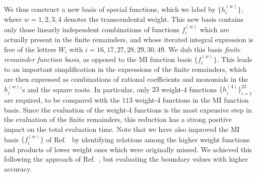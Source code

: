 \documentclass[main.tex]{subfiles}
\begin{document}
We thus construct a new basis of special functions, which we label by $\{h^{(w)}_i\}$, where $w=1,2,3,4$ denotes the transcendental weight. This new basis contains only those linearly independent combinations of functions $f^{(w)}_i$ which are actually present in the finite remainders, and whose iterated integral expression is free of the letters $W_i$ with $i=16,17,27,28,29,30,49$. We dub this basis \textit{finite remainder function basis}, as opposed to the MI function basis $\{f^{(w)}_i\}$. This leads to an important simplification in the expressions of the finite remainders, which are then expressed as combinations of rational coefficients and monomials in the $h^{(w)}_i$'s and the square roots. In particular, only $23$ weight-4 functions $\{h^{(4)}_i\}_{i=1}^{23}$ are required, to be compared with the $113$ weight-4 functions in the MI function basis. Since the evaluation of the weight-4 functions is the most expensive step in the evaluation of the finite remainders, this reduction has a strong positive impact on the total evaluation time. Note that we have also improved the MI basis $\{f^{(w)}_i\}$ of Ref.~\cite{Badger:2021nhg} by identifying relations among the higher weight functions and products of lower weight ones which were originally missed. We achieved this following the approach of Ref.~\cite{Badger:2021nhg}, but evaluating the boundary values with higher accuracy.
\end{document}
